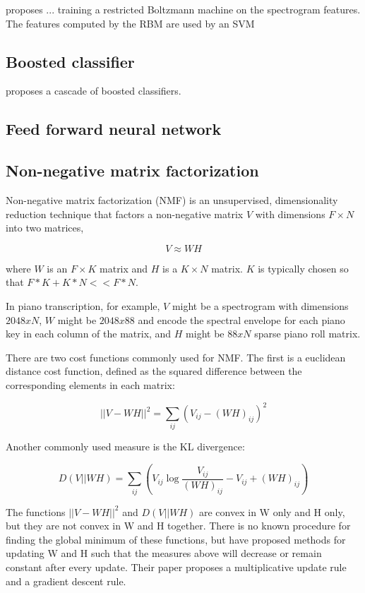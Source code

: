 \documentclass[5p]{elsarticle}
\begin{document}
\citet{nam2011classification} proposes ...
 training a restricted Boltzmann machine on the spectrogram features. The features computed by the RBM are used by an SVM 


\subsection{Boosted classifier}

\citet{boogaart2009note} proposes a cascade of boosted classifiers.

\subsection{Feed forward neural network}



\subsection{Non-negative matrix factorization}

Non-negative matrix factorization (NMF) is an unsupervised, dimensionality reduction technique that factors a non-negative matrix $V$ with dimensions $F \times N$ into two matrices,

\[ V \approx WH \]

\noindent where $W$ is an $F \times K$ matrix and $H$ is a $K \times N$ matrix. $K$ is typically chosen so that $F*K + K*N << F*N$.

In piano transcription, for example, $V$ might be a spectrogram with dimensions $2048xN$, $W$ might be $2048x88$ and encode the spectral envelope for each piano key in each column of the matrix, and $H$ might be $88xN$ sparse piano roll matrix.

There are two cost functions commonly used for NMF. The first is a euclidean distance cost function, defined as the squared difference between the corresponding elements in each matrix:

\[ \displaystyle ||V-WH||^{2} = \sum_{ij} (V_{ij} - (WH)_{ij})^{2} \]

\noindent Another commonly used measure is the KL divergence:

\[ \displaystyle D(V||WH) = \sum_{ij} (V_{ij} \log \frac{V_{ij}}{(WH)_{ij}} - V_{ij} + (WH)_{ij}) \]

The functions $||V-WH||^{2}$ and $D(V||WH)$ are convex in W only and H only, but they are not convex in W and H together. There is no known procedure for finding the global minimum of these functions, but \citet{seung2001algorithms} have proposed methods for updating W and H such that the measures above will decrease or remain constant after every update. Their paper proposes a multiplicative update rule and a gradient descent rule.
\end{document}
